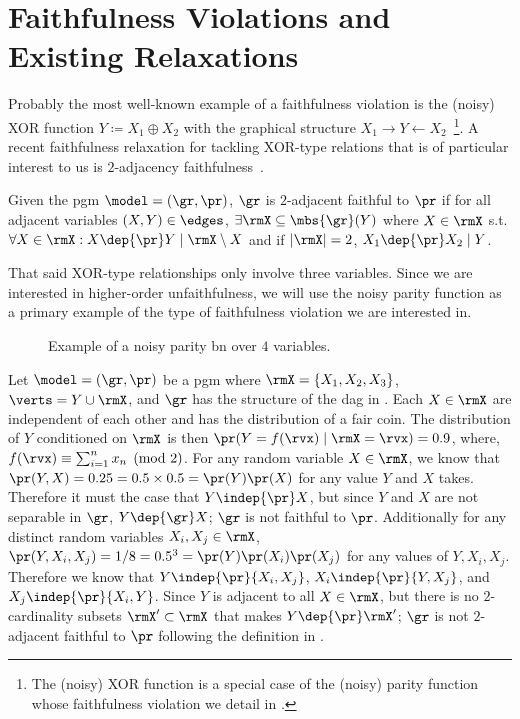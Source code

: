 \documentclass[accepted]{uai2026} %
\theoremstyle{plain}
\theoremstyle{definition}
\theoremstyle{remark}
\begin{document}
\section{Faithfulness Violations and Existing Relaxations}\label{sec:violation}
Probably the most well-known example of a faithfulness violation is the
(noisy) XOR function $Y\coloneq X_{1}\oplus X_{2}$ with the graphical
structure
$X_{1}\rightarrow Y \leftarrow
X_{2}$~\citep{inazumi2011,marx2021}\footnote{The (noisy) XOR function is
a special case of the (noisy) parity function whose faithfulness
violation we detail in .}.
A
recent faithfulness relaxation for tackling XOR-type relations that is
of particular interest to us is $2$-adjacency
faithfulness~\citep{marx2021}.
\begin{definition}
  Given the \gls{pgm} $\model=(\gr,\pr)$, $\gr$ is $2$-adjacent faithful
  to $\pr$ if for all adjacent variables $(X,Y)\in\edges$, $\exists \rmX
  \subseteq \mbs{\gr}(Y)$ where $X\in\rmX$ s.t. $\forall X \in \rmX: X
  \dep{\pr} Y \mid \rmX \setminus X$ and if $|\rmX|=2$,
  $X_{1}\dep{\pr}X_{2} \mid Y$.
\end{definition}
That said XOR-type relationships only involve three variables. Since we
are interested in higher-order unfaithfulness, we will use the
noisy parity function as a primary example of the type of faithfulness
violation we are interested in.
\begin{figure}
  \centering
  
  \caption{Example of a noisy parity \gls{bn} over $4$ variables.}
  \label{fig:parity}
\end{figure}
\begin{example}\label{ex:parity}
  Let $\model=(\gr,\pr)$ be a \gls{pgm} where
  $\rmX=\{X_{1},X_{2},X_{3}\}$, $\verts=Y\cup\rmX$, and $\gr$ has the
  structure of the \gls{dag} in . Each $X\in\rmX$ are
  independent of each other and has the distribution of a fair coin. The
  distribution of $Y$ conditioned on $\rmX$ is then
  $\pr(Y=f(\rvx)\mid\rmX=\rvx) = 0.9$, where,
  $f(\rvx) \equiv \sum_{i=1}^{n}x_{n}\pmod{2}$. For any random variable
  $X\in\rmX$, we know that $\pr(Y,X)=0.25=0.5\times 0.5=\pr(Y)\pr(X)$
  for any value $Y$ and $X$ takes. Therefore it must the case that
  $Y \indep{\pr} X$, but since $Y$ and $X$ are not separable in $\gr$,
  $Y\dep{\gr} X$; $\gr$ is not faithful to $\pr$.  Additionally for any
  distinct random variables $X_{i},X_{j}\in\rmX$,
  $\pr(Y,X_{i},X_{j})=1/8=0.5^{3}=\pr(Y)\pr(X_{i})\pr(X_{j})$ for any
  values of $Y,X_{i},X_{j}$. Therefore we know that
  $Y\indep{\pr}\{X_{i},X_{j}\}$, $X_{i}\indep{\pr}\{Y,X_{j}\}$, and
  $X_{j}\indep{\pr}\{X_{i},Y\}$. Since $Y$ is adjacent to all
  $X\in\rmX$, but there is no $2$-cardinality subsets $\rmX'\subset\rmX$
  that makes $Y\dep{\pr}\rmX'$; $\gr$ is not $2$-adjacent faithful to
  $\pr$ following the definition in \citet[Definition 7]{marx2021}.
\end{example}
\end{document}
